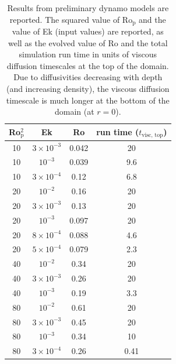 \begin{table}[ht!]
    \caption[Preliminary Rossby numbers in Mdwarf simulations.]{
	Results from preliminary dynamo models are reported.
	The squared value of Ro$_\text{p}$ and the value of Ek (input values) are reported, as well as the evolved value of Ro and the total simulation run time in units of viscous diffusion timescales at the top of the domain.
	Due to diffusivities decreasing with depth (and increasing density), the viscous diffusion timescale is much longer at the bottom of the domain (at $r = 0$).
	}
    \begin{center}
    \begin{tabular}{c c c c} \hline
	Ro$_\text{p}^2$ & Ek &  Ro & run time ($t_{\text{visc, top}}$) \\
	\hline
	10	&	$3 \times 10^{-3}$	& 0.042 & 	20	\\
	10	&	$10^{-3}$			& 0.039	&	9.6 \\
	10 	&	$3 \times 10^{-4}$	& 0.12	&	6.8 \\
	20	&	$10^{-2}$			& 0.16	&	20 \\
	20	&	$3 \times 10^{-3}$	& 0.13	&	20 \\
	20	&	$10^{-3}$			& 0.097 &	20 \\
	20 	&	$8 \times 10^{-4}$	& 0.088	&	4.6 \\
	20	&	$5 \times 10^{-4}$	& 0.079 &	2.3 \\
	40	&	$10^{-2}$			& 0.34	&	20  \\
	40	&	$3 \times 10^{-3}$	& 0.26	&	20  \\
	40	&	$10^{-3}$			& 0.19	&	3.3 \\
	80	&	$10^{-2}$			& 0.61	&	20  \\
	80	&	$3 \times 10^{-3}$	& 0.45	&	20  \\
	80	&	$10^{-3}$			& 0.34	&	10	\\
	80	&	$3 \times 10^{-4}$	& 0.26	&	0.41 \\
	\end{tabular}
\end{center}
\vspace{0.5cm}
\label{table:rop_spheres}
\end{table}




